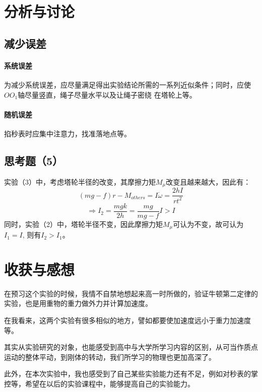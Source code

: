 \documentclass{ctexart}
\begin{document}
      \section{分析与讨论}
      \subsection{减少误差}
      \paragraph{系统误差}为减少系统误差，应尽量满足得出实验结论所需的一系列近似条件；同时，应使$OO_1$轴尽量竖直，绳子尽量水平以及让绳子密绕
      在塔轮上等。
      \paragraph{随机误差}掐秒表时应集中注意力，找准落地点等。
      \subsection{思考题（5）}
      实验（3）中，考虑塔轮半径的改变，其摩擦力矩$M_{\mu}$改变且越来越大，因此有：
      $$(mg-f)r-M_{others}=I\dot\omega=\frac{2hI}{rt^2}$$
      $$\Rightarrow I_2=\frac{mgk}{2h}=\frac{mg}{mg-f}I>I$$
      同时，实验（2）中，塔轮半径不变，因此摩擦力矩$M_{\mu}$可认为不变，故可认为$I_1=I$,
      则有$I_2>I_1$。
      \section{收获与感想}
      在预习这个实验的时候，我情不自禁地想起来高一时所做的，验证牛顿第二定律的实验，也是用重物的重力做外力并计算加速度。

      在我看来，这两个实验有很多相似的地方，譬如都要使加速度远小于重力加速度等。

      其实从实验研究的对象，也能感受到高中与大学所学习内容的区别，从可当作质点运动的整体平动，到刚体的转动，我们所学习的物理也更加高深了。

      此外，在本次实验中，我也感受到了自己某些实验能力还有不足，例如对秒表的掌控等，希望在以后的实验课程中，能够提高自己的实验能力。
\end{document}
